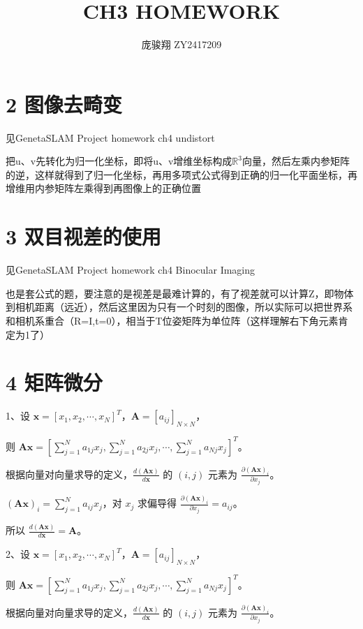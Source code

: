 \documentclass[12pt, a4paper, oneside]{ctexart}
\title{\vspace{-4cm}\bfseries{CH3 HOMEWORK}}
\author{\large 庞骏翔 \quad ZY2417209}  %
\date{}
\begin{document}
	
	\pagestyle{plain}
	\maketitle
	\section{2 图像去畸变}
	
	见GenetaSLAM Project homework ch4 undistort
	
	把u、v先转化为归一化坐标，即将u、v增维坐标构成$\mathbb{R}^{3}$向量，然后左乘内参矩阵的逆，这样就得到了归一化坐标，再用多项式公式得到正确的归一化平面坐标，再增维用内参矩阵左乘得到再图像上的正确位置
	
	\section{3 双目视差的使用}
	
	见GenetaSLAM Project homework ch4 Binocular Imaging
	
	也是套公式的题，要注意的是视差是最难计算的，有了视差就可以计算Z，即物体到相机距离（远近），然后这里因为只有一个时刻的图像，所以实际可以把世界系和相机系重合（R=I,t=0），相当于T位姿矩阵为单位阵（这样理解右下角元素肯定为1了）
	
	\section{4 矩阵微分}

	1、设 $\mathbf{x} = [x_1, x_2, \cdots, x_N]^T$，$\mathbf{A} = [a_{ij}]_{N\times N}$，
	
	则 $\mathbf{Ax} = \left[\sum_{j = 1}^{N}a_{1j}x_j, \sum_{j = 1}^{N}a_{2j}x_j, \cdots, \sum_{j = 1}^{N}a_{Nj}x_j\right]^T$。
	
	根据向量对向量求导的定义，$\frac{d(\mathbf{Ax})}{d\mathbf{x}}$ 的 $(i, j)$ 元素为 $\frac{\partial (\mathbf{Ax})_i}{\partial x_j}$。
	
	$(\mathbf{Ax})_i=\sum_{j = 1}^{N}a_{ij}x_j$，对 $x_j$ 求偏导得 $\frac{\partial (\mathbf{Ax})_i}{\partial x_j}=a_{ij}$。
	
	所以 $\frac{d(\mathbf{Ax})}{d\mathbf{x}}=\mathbf{A}$。
	
	
	2、设 $\mathbf{x} = [x_1, x_2, \cdots, x_N]^T$，$\mathbf{A} = [a_{ij}]_{N\times N}$，
	
	则 $\mathbf{Ax} = \left[\sum_{j = 1}^{N}a_{1j}x_j, \sum_{j = 1}^{N}a_{2j}x_j, \cdots, \sum_{j = 1}^{N}a_{Nj}x_j\right]^T$。
	
	根据向量对向量求导的定义，$\frac{d(\mathbf{Ax})}{d\mathbf{x}}$ 的 $(i, j)$ 元素为 $\frac{\partial (\mathbf{Ax})_i}{\partial x_j}$。
	
\end{document}

